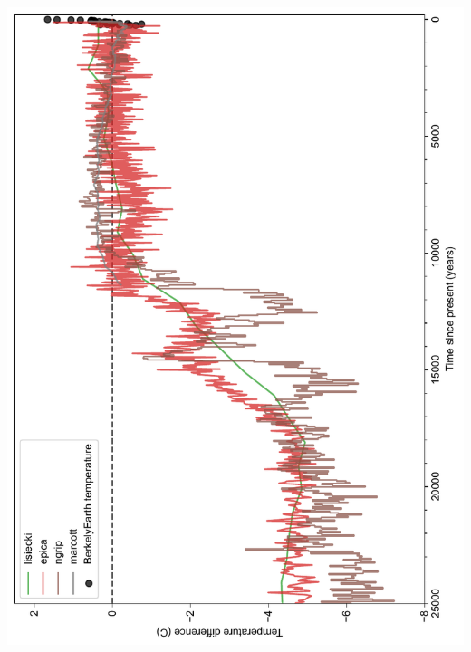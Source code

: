 \documentclass[12pt]{article}
\begin{document}
\newpage

\begin{center}
\includegraphics[width=\textwidth]{images/row4_25kya.pdf}
\end{center}

\newpage
\end{document}

